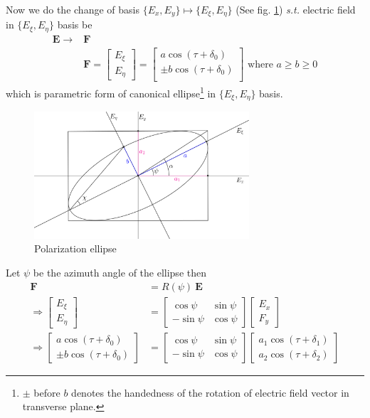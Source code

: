 \documentclass[11pt,a4paper]{article}
\numberwithin{equation}{section}
\begin{document}
Now we do the change of basis $\{E_x,E_y\}\longmapsto\{E_\xi,E_\eta\}$ (See fig. \ref{fig:pol ellipse}) \textit{s.t.} electric field in $\{E_\xi,E_\eta\}$ basis be
\begin{align}
	\boldsymbol{E}\rightarrow&\boldsymbol{F}\nonumber\\
	&\boldsymbol{F} =
	\begin{bmatrix}
		E_\xi\\E_\eta
	\end{bmatrix}=
	\begin{bmatrix}
		a \cos(\tau+\delta_0)\\
		\pm b \cos(\tau+\delta_0)\\
	\end{bmatrix} \text{ where } a\ge b\ge 0
\end{align}
which is parametric form of canonical ellipse\footnote{$\pm$ before $b$ denotes the handedness of the rotation of electric field vector in transverse plane.} in $\{E_\xi,E_\eta\}$ basis.
\begin{figure}[H]
	\centering
	\includegraphics[width=8cm]{ellipse.png}
	\caption{Polarization ellipse}
	\label{fig:pol ellipse}
\end{figure}

Let $\psi$ be the azimuth angle of the ellipse then 
\begin{align}
	\boldsymbol{F}&= R(\psi)\:\boldsymbol{E}\\
	\Rightarrow\begin{bmatrix}E_\xi\\E_\eta\end{bmatrix}&= 
	\begin{bmatrix}
		\cos\psi & \sin\psi \\
		-\sin\psi & \cos\psi
	\end{bmatrix}
	\begin{bmatrix}E_x\\F_y\end{bmatrix}\\
	\Rightarrow
	\begin{bmatrix}
		a \cos(\tau+\delta_0)\\
		\pm b \cos(\tau+\delta_0)
	\end{bmatrix}&=
	\begin{bmatrix}
		\cos\psi & \sin\psi \\
		-\sin\psi & \cos\psi
	\end{bmatrix}
	\begin{bmatrix}
		a_1 \cos(\tau+\delta_1)\\
		a_2 \cos(\tau+\delta_2)
	\end{bmatrix}
\end{align}
\end{document}
